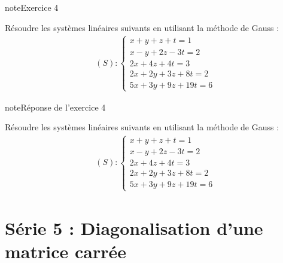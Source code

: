 \documentclass[letterpaper,10pt,french]{jupyterBook}
\begin{document}
\begin{sphinxadmonition}{note}{Exercice 4}

\sphinxAtStartPar
Résoudre les systèmes linéaires suivants en utilisant la méthode de Gauss :
\begin{equation*}
\begin{split} 
(S) :
\left\{
\begin{array}{l}
x + y + z + t = 1 \\
x − y + 2z − 3t = 2 \\
2x + 4z + 4t = 3 \\
2x + 2y + 3z + 8t = 2 \\
5x + 3y + 9z + 19t = 6
\end{array}
\right.
\end{split}
\end{equation*}\end{sphinxadmonition}

\begin{sphinxadmonition}{note}{Réponse de l’exercice 4}

\sphinxAtStartPar
Résoudre les systèmes linéaires suivants en utilisant la méthode de Gauss :
\begin{equation*}
\begin{split} 
(S) :
\left\{
\begin{array}{l}
x + y + z + t = 1 \\
x − y + 2z − 3t = 2 \\
2x + 4z + 4t = 3 \\
2x + 2y + 3z + 8t = 2 \\
5x + 3y + 9z + 19t = 6
\end{array}
\right.
\end{split}
\end{equation*}\end{sphinxadmonition}

\begin{sphinxVerbatim}[commandchars=\\\{\}]

\end{sphinxVerbatim}


\chapter{Série 5 : Diagonalisation d’une matrice carrée}
\label{\detokenize{S_xe9rie5:serie-5-diagonalisation-dune-matrice-carree}}\label{\detokenize{S_xe9rie5::doc}}






\renewcommand{\indexname}{Index}
\printindex
\end{document}

